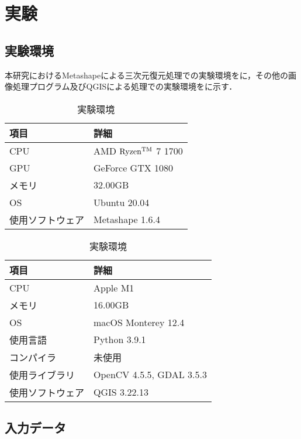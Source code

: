 \chapter{実験}
  \section{実験環境}
    本研究におけるMetashapeによる三次元復元処理での実験環境をに，その他の画像処理プログラム及びQGISによる処理での実験環境をに示す．

    \begin{table}[tbp]
      \centering
      \caption{実験環境}
      \label{実験環境1}
      \begin{tabular}{ll}
        \hline
        \textbf{項目} & \textbf{詳細} \\
        \hline \hline
        CPU & AMD $\rm{Ryzen^{TM}}$ 7 1700 \\
        GPU & GeForce GTX 1080 \\
        メモリ & 32.00GB \\
        OS & Ubuntu 20.04 \\
        使用ソフトウェア & Metashape 1.6.4 \\ \hline 
      \end{tabular}
    \end{table}

    \begin{table}[tbp]
      \centering
      \caption{実験環境}
      \label{実験環境2}
      \begin{tabular}{ll}
        \hline
        \textbf{項目} & \textbf{詳細} \\
        \hline \hline
        CPU & Apple M1 \\
        メモリ & 16.00GB \\
        OS & macOS Monterey 12.4 \\
        使用言語 & Python 3.9.1 \\
        コンパイラ & 未使用 \\
        使用ライブラリ & OpenCV 4.5.5, GDAL 3.5.3 \\ 
        使用ソフトウェア & QGIS 3.22.13 \\ \hline 
      \end{tabular}
    \end{table}



  \section{入力データ}
    \label{入力データ（実験）}
